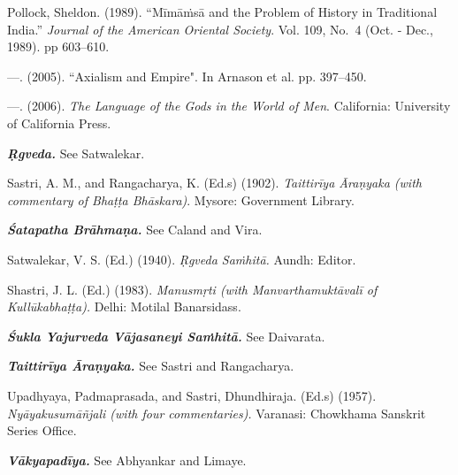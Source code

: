 \begin{thebibliography}{99}
  Pollock, Sheldon. (1989). “Mīmāṁsā and the Problem of History in Traditional India.” \textit{Journal of the American Oriental Society}. Vol. 109, No.~4 (Oct. - Dec., 1989). pp 603--610.

  —. (2005). ``Axialism and Empire". In Arnason et al. pp. 397--450.

  —. (2006). \textit{The Language of the Gods in the World of Men}. California: University of California Press.

  \textbf{\textit{Ṛgveda.}} See Satwalekar.

  Sastri, A. M., and Rangacharya, K. (Ed.s) (1902). \textit{Taittirīya Āraṇyaka (with commentary of Bhaṭṭa Bhāskara)}. Mysore: Government Library.

  \textbf{\textit{Śatapatha Brāhmaṇa.}} See Caland and Vira.

  Satwalekar, V. S. (Ed.) (1940). \textit{Ṛgveda Saṁhitā.} Aundh: Editor.

  Shastri, J. L. (Ed.) (1983). \textit{Manusmṛti (with Manvarthamuktāvalī of Kullūkabhaṭṭa).} Delhi: Motilal Banarsidass.

  \textbf{\textit{Śukla Yajurveda Vājasaneyi Saṁhitā.}} See Daivarata.

  \textbf{\textit{Taittirīya Āraṇyaka.}} See Sastri and Rangacharya.

  Upadhyaya, Padmaprasada, and Sastri, Dhundhiraja. (Ed.s) (1957). \textit{Nyāyakusumāñjali (with four commentaries).} Varanasi: Chowkhama Sanskrit Series Office.

  \textbf{\textit{Vākyapadīya.}} See Abhyankar and Limaye.

 \end{thebibliography}

\egroup

\egroup

